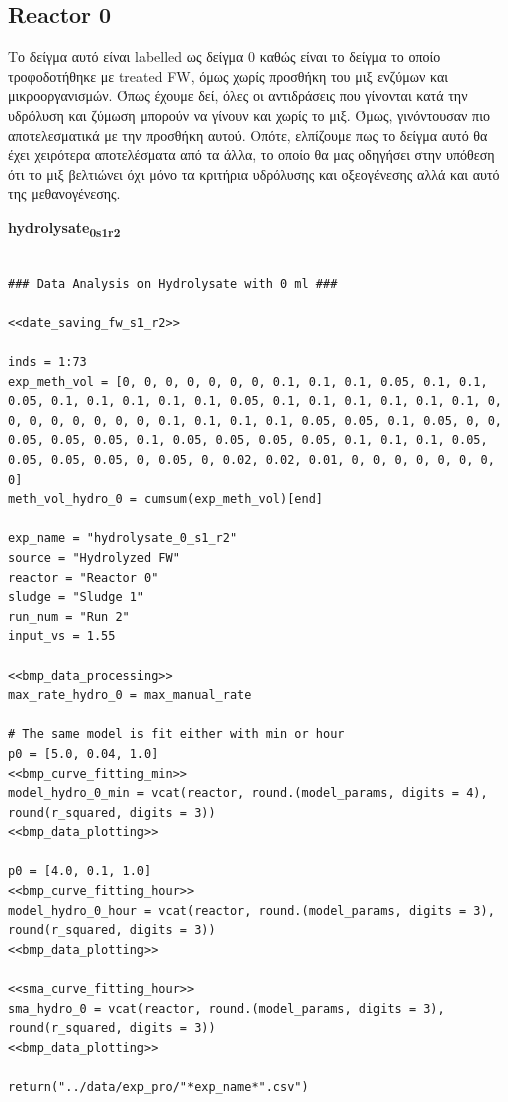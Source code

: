 \documentclass[11pt]{article}
\begin{document}
\subsection{Reactor 0}
\label{sec:org0be6339}
Το δείγμα αυτό είναι labelled ως δείγμα 0 καθώς είναι το δείγμα το οποίο τροφοδοτήθηκε με treated FW, όμως χωρίς προσθήκη του μιξ ενζύμων και μικροοργανισμών. Όπως έχουμε δεί, όλες οι αντιδράσεις που γίνονται κατά την υδρόλυση και ζύμωση μπορούν να γίνουν και χωρίς το μιξ. Όμως, γινόντουσαν πιο αποτελεσματικά με την προσθήκη αυτού. Οπότε, ελπίζουμε πως το δείγμα αυτό θα έχει χειρότερα αποτελέσματα από τα άλλα, το οποίο θα μας οδηγήσει στην υπόθεση ότι το μιξ βελτιώνει όχι μόνο τα κριτήρια υδρόλυσης και οξεογένεσης αλλά και αυτό της μεθανογένεσης.

\textbf{hydrolysate\textsubscript{0}\textsubscript{s1}\textsubscript{r2}}
\begin{verbatim}

### Data Analysis on Hydrolysate with 0 ml ###

<<date_saving_fw_s1_r2>>

inds = 1:73
exp_meth_vol = [0, 0, 0, 0, 0, 0, 0, 0.1, 0.1, 0.1, 0.05, 0.1, 0.1, 0.05, 0.1, 0.1, 0.1, 0.1, 0.1, 0.05, 0.1, 0.1, 0.1, 0.1, 0.1, 0.1, 0, 0, 0, 0, 0, 0, 0, 0, 0.1, 0.1, 0.1, 0.1, 0.05, 0.05, 0.1, 0.05, 0, 0, 0.05, 0.05, 0.05, 0.1, 0.05, 0.05, 0.05, 0.05, 0.1, 0.1, 0.1, 0.05, 0.05, 0.05, 0.05, 0, 0.05, 0, 0.02, 0.02, 0.01, 0, 0, 0, 0, 0, 0, 0, 0]
meth_vol_hydro_0 = cumsum(exp_meth_vol)[end]

exp_name = "hydrolysate_0_s1_r2"
source = "Hydrolyzed FW"
reactor = "Reactor 0"
sludge = "Sludge 1"
run_num = "Run 2"
input_vs = 1.55

<<bmp_data_processing>>
max_rate_hydro_0 = max_manual_rate

# The same model is fit either with min or hour
p0 = [5.0, 0.04, 1.0]
<<bmp_curve_fitting_min>>
model_hydro_0_min = vcat(reactor, round.(model_params, digits = 4), round(r_squared, digits = 3))
<<bmp_data_plotting>>

p0 = [4.0, 0.1, 1.0]
<<bmp_curve_fitting_hour>>
model_hydro_0_hour = vcat(reactor, round.(model_params, digits = 3), round(r_squared, digits = 3))
<<bmp_data_plotting>>

<<sma_curve_fitting_hour>>
sma_hydro_0 = vcat(reactor, round.(model_params, digits = 3), round(r_squared, digits = 3))
<<bmp_data_plotting>>

return("../data/exp_pro/"*exp_name*".csv")
\end{verbatim}
\end{document}
